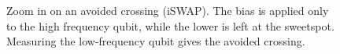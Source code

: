 \begin{figure}[htbp]
    \centering
    \caption{Zoom in on an avoided crossing (iSWAP). The bias is applied only to the high frequency qubit, while the lower is left at the sweetspot. Measuring the low-frequency qubit gives the avoided crossing.}
    \label{fig:avoided_crossing_qblox}
\end{figure}





